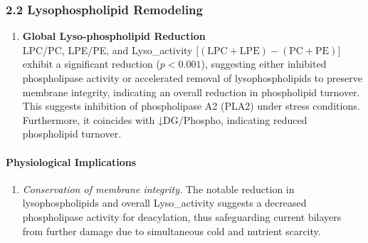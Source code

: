\documentclass[10pt,letterpaper]{article}
\begin{document}

\subsubsection*{2.2 Lysophospholipid Remodeling}
\begin{enumerate}
  \item \textbf{Global Lyso-phospholipid Reduction} \\
  LPC/PC, LPE/PE, and Lyso\_activity \(\bigl[(\mathrm{LPC} + \mathrm{LPE}) - (\mathrm{PC} + \mathrm{PE})\bigr]\) exhibit a significant reduction (\(p<0.001\)), suggesting either inhibited phospholipase activity or accelerated removal of lysophospholipids to preserve membrane integrity, indicating an overall reduction in phospholipid turnover. This suggests inhibition of phospholipase A2 (PLA2) under stress conditions. Furthermore, it coincides with ↓DG/Phospho, indicating reduced phospholipid turnover.

\end{enumerate}

\paragraph{Physiological Implications}
\begin{enumerate}
  \item \textit{Conservation of membrane integrity.}  
        The notable reduction in lysophospholipids and overall Lyso\_activity suggests a decreased phospholipase activity for deacylation, thus safeguarding current bilayers from further damage due to simultaneous cold and nutrient scarcity.
\end{enumerate}
\end{document}
